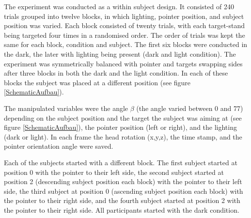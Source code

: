 The experiment was conducted as a within subject design. It consisted of 240 trials grouped into twelve blocks, in which lighting, pointer position, and subject position was varied.  Each block consisted of twenty trials, with each target-stand being targeted four times in a randomised order. The order of trials was kept the same for each block, condition and subject. The first six blocks were conducted in the dark, the later with lighting being present (dark and light condition). The experiment was symmetrically balanced with pointer and targets swapping sides after three blocks in both the dark and the light condition. In each of these blocks the subject was placed at a different position (see figure \ref{SchematicAufbau}). 

The manipulated variables were the angle $\beta$ (the angle varied between 0\textdegree{} and 77\textdegree{}) depending on the subject position and the target the subject was aiming at (see figure \ref{SchematicAufbau}), the pointer position (left or right), and the lighting (dark or light). In each frame the head rotation (x,y,z), the time stamp, and the pointer orientation angle were saved. 

Each of the subjects started with a different block. The first subject started at position 0 with the pointer to their left side, the second subject started at position 2 (descending subject position each block) with the pointer to their left side, the third subject at position 0 (ascending subject position each block) with the pointer to their right side, and the fourth subject started at position 2 with the pointer to their right side. All participants started with the dark condition.


